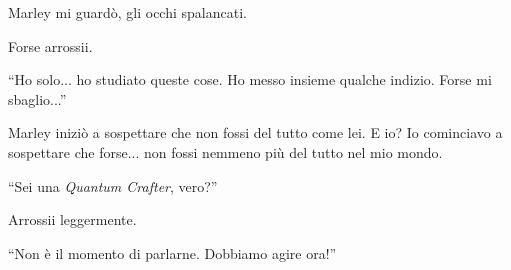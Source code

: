 Marley mi guardò, gli occhi spalancati.

Forse arrossii.

\begin{dialogue}
 \enquote{Ho solo... ho studiato queste cose. Ho messo insieme qualche indizio. Forse mi sbaglio...}
\end{dialogue}

Marley iniziò a sospettare che non fossi del tutto come lei. E io? Io cominciavo a sospettare che forse... non fossi nemmeno più del tutto nel mio mondo.


\begin{dialogue}
 \enquote{Sei una \textit{Quantum Crafter}, vero?}
\end{dialogue}

Arrossii leggermente.

\begin{dialogue}
 \enquote{Non è il momento di parlarne. Dobbiamo agire ora!}
\end{dialogue}

\begin{center}
\begin{minipage}{0.7\textwidth}
    \centering
\end{minipage}
\end{center}

